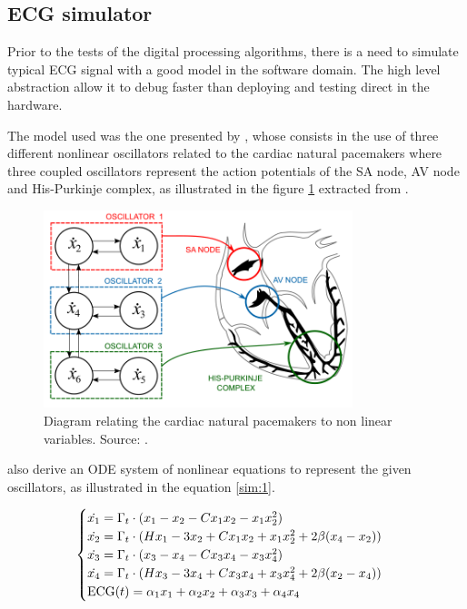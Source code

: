 \subsection{ECG simulator}

Prior to the tests of the digital processing algorithms, there is a need to simulate typical ECG signal with a good model in the software domain. The high level abstraction allow it to debug faster than deploying and testing direct in the hardware.

The model used was the one presented by \textcite{quiroz2019generation}, whose consists in the use of three different nonlinear oscillators related to the cardiac natural pacemakers where three coupled oscillators represent the action potentials of the SA node, AV node and His-Purkinje complex, as illustrated in the figure \ref{fig:simulate} extracted from \textcite{quiroz2019generation}.

\begin{figure}[h!] 
    \centering
    \includegraphics[width=9cm]{images/oscillators.png}
    \caption{Diagram relating the cardiac natural pacemakers to non linear variables. Source: \textcite{quiroz2019generation}.}
    \label{fig:simulate}
\end{figure}

\textcite{quiroz2019generation} also derive an ODE system of nonlinear equations to represent the given oscillators, as illustrated in the equation \ref{sim:1}.

\begin{center}

\begin{equation} \label{sim:1}
\centering
\begin{cases}
    \dot{x_1} = \Gamma_t \cdot (x_1 - x_2 - Cx_1x_2 - x_1x_2^2) \\
    \dot{x_2} = \Gamma_t \cdot (Hx_1 - 3x_2 + Cx_1x_2 + x_1x_2^2 + 2 \beta(x_4-x_2)) \\
    \dot{x_3} = \Gamma_t \cdot (x_3 - x_4 - Cx_3x_4 - x_3x_4^2) \\
    \dot{x_4} = \Gamma_t \cdot (Hx_3 - 3x_4 + Cx_3x_4 + x_3x_4^2 + 2 \beta(x_2-x_4)) \\
    \text{ECG}(t) = \alpha_1 x_1 + \alpha_2 x_2 + \alpha_3 x_3 + \alpha_4 x_4
\end{cases} 
\end{equation}
\end{center}

